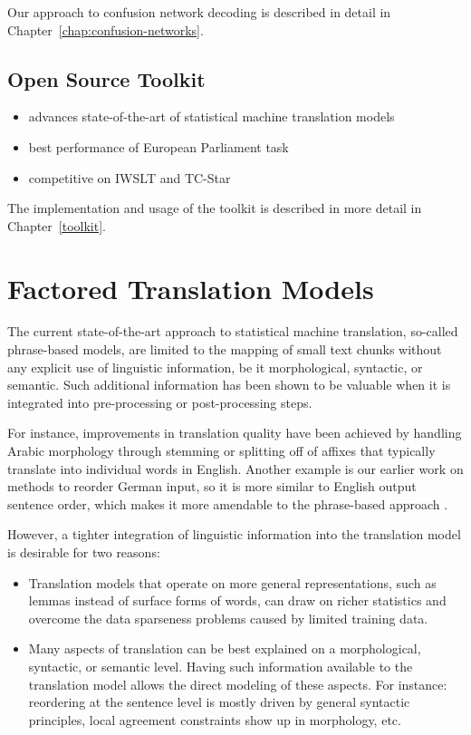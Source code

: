 \documentclass[11pt]{report}
\theoremstyle{plain}
\begin{document}
Our approach to confusion network decoding is described in detail in Chapter~\ref{chap:confusion-networks}.

\section{Open Source Toolkit}
{\sc \begin{itemize}
\item advances state-of-the-art of statistical machine translation models
\item best performance of European Parliament task
\item competitive on IWSLT and TC-Star
\end{itemize}}

The implementation and usage of the toolkit is described in more detail in Chapter~\ref{toolkit}.

\chapter{Factored Translation Models}\label{chap:factored-models}
The current state-of-the-art approach to statistical machine translation, so-called phrase-based models, are limited to the mapping of small text chunks without any explicit use of linguistic information, be it morphological, syntactic, or semantic. Such additional information has been shown to be valuable when it is integrated into pre-processing or post-processing steps. 

For instance, improvements in translation quality have been achieved by handling Arabic morphology through stemming or splitting off of affixes that typically translate into individual words in English. Another example is our earlier work on methods to reorder German input, so it is more similar to English output sentence order, which makes it more amendable to the phrase-based approach \cite{Collins2005}.

However, a tighter integration of linguistic information into the translation model is desirable for two reasons:
\begin{itemize}
\item Translation models that operate on more general representations, such as lemmas instead of surface forms of words, can draw on richer statistics and overcome the data sparseness problems caused by limited training data.
\item Many aspects of translation can be best explained on a morphological, syntactic, or semantic level. Having such information available to the translation model allows the direct modeling of these aspects. For instance: reordering at the sentence level is mostly driven by general syntactic principles, local agreement constraints show up in morphology, etc.
\end{itemize}
\end{document}
